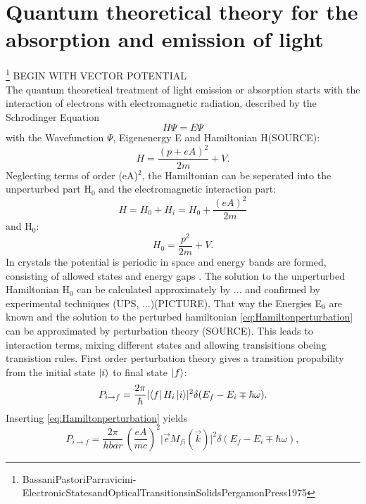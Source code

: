 \section{Quantum theoretical theory for the absorption and emission of light} \footnote{BassaniPastoriParravicini-ElectronicStatesandOpticalTransitionsinSolidsPergamonPress1975}
BEGIN WITH VECTOR POTENTIAL \\
The quantum theoretical treatment of light emission or absorption starts with the interaction of electrons with electromagnetic radiation, described by the Schrodinger Equation
\begin{equation}
	H\Psi = E\Psi
\end{equation}
with the Wavefunction $\Psi$, Eigenenergy E and Hamiltonian H(SOURCE):
\begin{equation}
	H =\frac{(p + eA)^2}{2m} + V.
\end{equation}
Neglecting terms of order (eA)$^2$, the Hamiltonian can be seperated into the unperturbed part H$_0$ and the electromagnetic interaction part:
\begin{equation}\label{eq:Hamiltonperturbation}
	H = H_0 + H_i = H_0 + \frac{(eA)^2}{2m}
\end{equation}
and H$_0$:
\begin{equation}
	H_0 = \frac{p^2}{2m} + V.
\end{equation}
In crystals the potential is periodic in space and energy bands are formed, consisting of allowed states and energy gaps . The solution to the unperturbed Hamiltonian H$_0$ can be calculated approximately by ... and confirmed by experimental techniques (UPS, ...)(PICTURE). That way the Energies E$_0$ are known and the solution to the perturbed hamiltonian \autoref{eq:Hamiltonperturbation} can be approximated by perturbation theory (SOURCE). This leads to interaction terms, mixing different states and allowing transisitions obeing transistion rules.
First order perturbation theory gives a transition propability from the initial state $\ket{i}$ to final state $\ket{f}$:
\begin{equation}
P_{i\rightarrow f} = \frac{2\pi}{\hbar} \lvert\bra{f}H_i\ket{i}\rvert^2 \delta(E_f - E_i \mp \hbar \omega).
\end{equation}
Inserting \autoref{eq:Hamiltonperturbation} yields
\begin{equation}
	P_{i\rightarrow f} = \frac{2\pi}{hbar}\,\left(\frac{eA}{mc}\right)^2 \lvert \vec{e} M_{fi}(\vec{k})\rvert ^2  \delta(E_f - E_i \mp \hbar \omega),
\end{equation}
